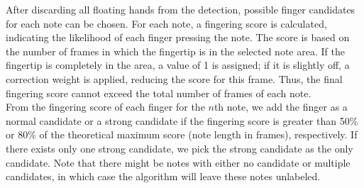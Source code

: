 \documentclass{article}
\begin{document}

After discarding all floating hands from the detection, possible finger candidates for each note can be chosen. For each note, a fingering score is calculated, indicating the likelihood of each finger pressing the note. The score is based on the number of frames in which the fingertip is in the selected note area. If the fingertip is completely in the area, a value of 1 is assigned; if it is slightly off, a correction weight is applied, reducing the score for this frame. Thus, the final fingering score cannot exceed the total number of frames of each note.\\
From the fingering score of each finger for the $n$th note, we add the finger as a normal candidate or a strong candidate if the fingering score is greater than 50\% or 80\% of the theoretical maximum score (note length in frames), respectively. If there exists only one strong candidate, we pick the strong candidate as the only candidate. Note that there might be notes with either no candidate or multiple candidates, in which case the algorithm will leave these notes unlabeled.
\end{document}
